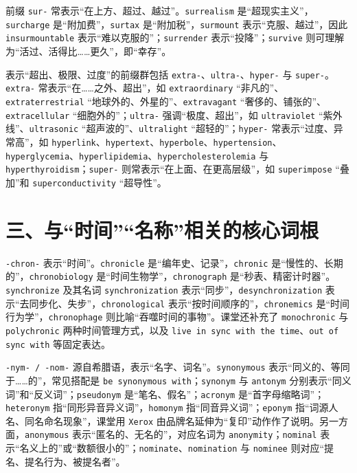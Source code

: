 \documentclass[UTF8,zihao=-4]{ctexart}
\begin{document}
前缀 \texttt{sur-} 常表示“在上方、超过、越过”。\texttt{surrealism} 是“超现实主义”，\texttt{surcharge} 是“附加费”，\texttt{surtax} 是“附加税”，\texttt{surmount} 表示“克服、越过”，因此 \texttt{insurmountable} 表示“难以克服的”；\texttt{surrender} 表示“投降”；\texttt{survive} 则可理解为“活过、活得比……更久”，即“幸存”。

表示“超出、极限、过度”的前缀群包括 \texttt{extra-}、\texttt{ultra-}、\texttt{hyper-} 与 \texttt{super-}。\texttt{extra-} 常表示“在……之外、超出”，如 \texttt{extraordinary} “非凡的”、\texttt{extraterrestrial} “地球外的、外星的”、\texttt{extravagant} “奢侈的、铺张的”、\texttt{extracellular} “细胞外的”；\texttt{ultra-} 强调“极度、超出”，如 \texttt{ultraviolet} “紫外线”、\texttt{ultrasonic} “超声波的”、\texttt{ultralight} “超轻的”；\texttt{hyper-} 常表示“过度、异常高”，如 \texttt{hyperlink}、\texttt{hypertext}、\texttt{hyperbole}、\texttt{hypertension}、\texttt{hyperglycemia}、\texttt{hyperlipidemia}、\texttt{hypercholesterolemia} 与 \texttt{hyperthyroidism}；\texttt{super-} 则常表示“在上面、在更高层级”，如 \texttt{superimpose} “叠加”和 \texttt{superconductivity} “超导性”。

\section*{三、与“时间”“名称”相关的核心词根}

\texttt{-chron-} 表示“时间”。\texttt{chronicle} 是“编年史、记录”，\texttt{chronic} 是“慢性的、长期的”，\texttt{chronobiology} 是“时间生物学”，\texttt{chronograph} 是“秒表、精密计时器”。\texttt{synchronize} 及其名词 \texttt{synchronization} 表示“同步”，\texttt{desynchronization} 表示“去同步化、失步”，\texttt{chronological} 表示“按时间顺序的”，\texttt{chronemics} 是“时间行为学”，\texttt{chronophage} 则比喻“吞噬时间的事物”。课堂还补充了 \texttt{monochronic} 与 \texttt{polychronic} 两种时间管理方式，以及 \texttt{live in sync with the time}、\texttt{out of sync with} 等固定表达。

\texttt{-nym- / -nom-} 源自希腊语，表示“名字、词名”。\texttt{synonymous} 表示“同义的、等同于……的”，常见搭配是 \texttt{be synonymous with}；\texttt{synonym} 与 \texttt{antonym} 分别表示“同义词”和“反义词”；\texttt{pseudonym} 是“笔名、假名”；\texttt{acronym} 是“首字母缩略词”；\texttt{heteronym} 指“同形异音异义词”，\texttt{homonym} 指“同音异义词”；\texttt{eponym} 指“词源人名、同名命名现象”，课堂用 \texttt{Xerox} 由品牌名延伸为“复印”动作作了说明。另一方面，\texttt{anonymous} 表示“匿名的、无名的”，对应名词为 \texttt{anonymity}；\texttt{nominal} 表示“名义上的”或“数额很小的”；\texttt{nominate}、\texttt{nomination} 与 \texttt{nominee} 则对应“提名、提名行为、被提名者”。
\end{document}
